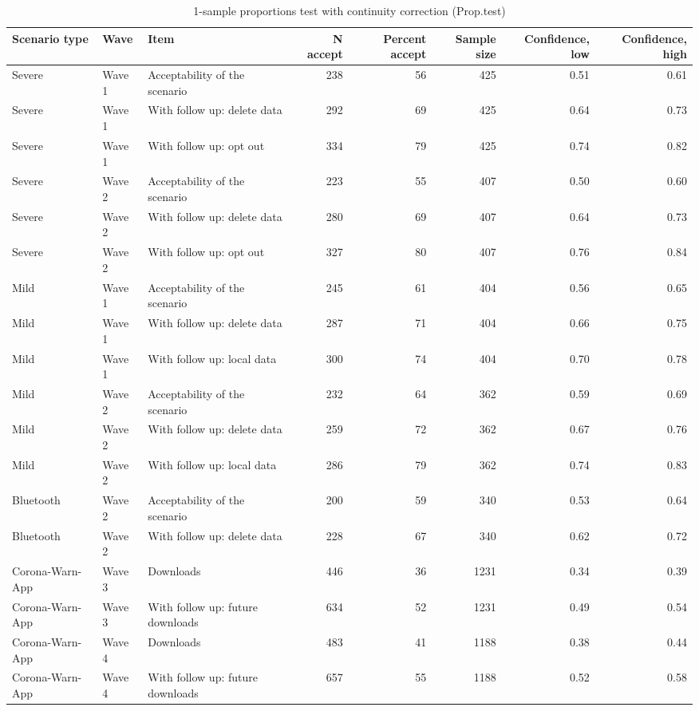 \begin{table*}

\caption{1-sample proportions test with continuity correction (Prop.test)\label{tbl:trend}}
\begin{tabular}[t]{lllrrrrr}
\toprule
Scenario type & Wave & Item & N accept & Percent accept & Sample size & Confidence, low & Confidence, high\\
\midrule
Severe & Wave 1 & Acceptability
of the scenario & 238 & 56 & 425 & 0.51 & 0.61\\
Severe & Wave 1 & With follow up:
delete data & 292 & 69 & 425 & 0.64 & 0.73\\
Severe & Wave 1 & With follow up:
opt out & 334 & 79 & 425 & 0.74 & 0.82\\
Severe & Wave 2 & Acceptability
of the scenario & 223 & 55 & 407 & 0.50 & 0.60\\
Severe & Wave 2 & With follow up:
delete data & 280 & 69 & 407 & 0.64 & 0.73\\
\addlinespace
Severe & Wave 2 & With follow up:
opt out & 327 & 80 & 407 & 0.76 & 0.84\\
Mild & Wave 1 & Acceptability
of the scenario & 245 & 61 & 404 & 0.56 & 0.65\\
Mild & Wave 1 & With follow up:
delete data & 287 & 71 & 404 & 0.66 & 0.75\\
Mild & Wave 1 & With follow up:
local data & 300 & 74 & 404 & 0.70 & 0.78\\
Mild & Wave 2 & Acceptability
of the scenario & 232 & 64 & 362 & 0.59 & 0.69\\
\addlinespace
Mild & Wave 2 & With follow up:
delete data & 259 & 72 & 362 & 0.67 & 0.76\\
Mild & Wave 2 & With follow up:
local data & 286 & 79 & 362 & 0.74 & 0.83\\
Bluetooth & Wave 2 & Acceptability
of the scenario & 200 & 59 & 340 & 0.53 & 0.64\\
Bluetooth & Wave 2 & With follow up:
delete data & 228 & 67 & 340 & 0.62 & 0.72\\
Corona-Warn-App & Wave 3 & Downloads & 446 & 36 & 1231 & 0.34 & 0.39\\
\addlinespace
Corona-Warn-App & Wave 3 & With follow up:
future downloads & 634 & 52 & 1231 & 0.49 & 0.54\\
Corona-Warn-App & Wave 4 & Downloads & 483 & 41 & 1188 & 0.38 & 0.44\\
Corona-Warn-App & Wave 4 & With follow up:
future downloads & 657 & 55 & 1188 & 0.52 & 0.58\\
\bottomrule
\end{tabular}
\end{table*}
